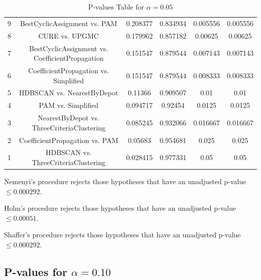 \documentclass[a4paper,10pt]{article}
\begin{document}
\begin{landscape}
\begin{table}[!htp]
\begin{tabular}{cccccc}
9&BestCyclicAssignment vs. PAM&0.208377&0.834934&0.005556&0.005556\\
8&CURE vs. UPGMC&0.179962&0.857182&0.00625&0.00625\\
7&BestCyclicAssignment vs. CoefficientPropagation&0.151547&0.879544&0.007143&0.007143\\
6&CoefficientPropagation vs. Simplified&0.151547&0.879544&0.008333&0.008333\\
5&HDBSCAN vs. NearestByDepot&0.11366&0.909507&0.01&0.01\\
4&PAM vs. Simplified&0.094717&0.92454&0.0125&0.0125\\
3&NearestByDepot vs. ThreeCriteriaClustering&0.085245&0.932066&0.016667&0.016667\\
2&CoefficientPropagation vs. PAM&0.05683&0.954681&0.025&0.025\\
1&HDBSCAN vs. ThreeCriteriaClustering&0.028415&0.977331&0.05&0.05\\
\hline
\end{tabular}
\caption{P-values Table for $\alpha=0.05$}
\end{table}Nemenyi's procedure rejects those hypotheses that have an unadjusted p-value $\le0.000292$.

Holm's procedure rejects those hypotheses that have an unadjusted p-value $\le0.00051$.

Shaffer's procedure rejects those hypotheses that have an unadjusted p-value $\le0.000292$.

\pagebreak

\subsection{P-values for $\alpha=0.10$}


\end{landscape}
\end{document}
